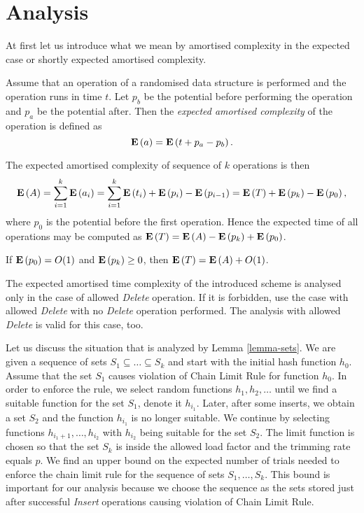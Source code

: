 \documentclass[runningheads,a4paper]{llncs}
\begin{document}
\section{Analysis}

At first let us introduce what we mean by amortised complexity in the expected case or shortly expected amortised complexity.

\begin{definition}
Assume that an operation of a randomised data structure is performed and the operation runs in time $t$. Let $p_b$ be the potential before performing the operation and $p_a$ be the potential after. Then the \emph{expected amortised complexity} of the operation is defined as \[ \mathbf{E}\left(a\right) = \mathbf{E}\left(t + p_a - p_{b}\right) \text{.} \]
\end{definition}

The expected amortised complexity of sequence of $k$ operations is then
\[
\mathbf{E}\left(A\right) = \sum_{i=1}^{k} \mathbf{E}\left(a_i\right) = \sum_{i = 1}^{k} \mathbf{E}\left(t_i\right) + \mathbf{E}\left(p_i\right) - \mathbf{E}\left(p_{i - 1}\right) = \mathbf{E}\left(T\right) + \mathbf{E}\left(p_k\right) - \mathbf{E}\left(p_0\right),
\]
where $p_0$ is the potential before the first operation. Hence the expected time of all operations may be computed as $\mathbf{E}\left(T\right) = \mathbf{E}\left(A\right) - \mathbf{E}\left(p_k\right) + \mathbf{E}\left(p_0\right)$.

\begin{remark}
\label{remark-expected-sequence}
If $\mathbf{E}\left(p_0\right) = O(1)$ and $\mathbf{E}\left(p_k\right) \geq 0$, then $\mathbf{E}\left(T\right) = \mathbf{E}\left(A\right) + O(1)$.
\end{remark}

The expected amortised time complexity of the introduced scheme is analysed only in the case of allowed \emph{Delete} operation. If it is forbidden, use the case with allowed \emph{Delete} with no \emph{Delete} operation performed. The analysis with allowed \emph{Delete} is valid for this case, too.

Let us discuss the situation that is analyzed by Lemma \ref{lemma-sets}. We are given a sequence of sets $S_1 \subseteq \dots \subseteq S_k$ and start with the initial hash function $h_0$. Assume that the set $S_1$ causes violation of Chain Limit Rule for function $h_0$. In order to enforce the rule, we select random functions $h_1, h_2, \dots$ until we find a suitable function for the set $S_1$, denote it $h_{i_1}$. Later, after some inserts, we obtain a set $S_2$ and the function $h_{i_1}$ is no longer suitable. We continue by selecting functions $h_{i_1 + 1}, \dots, h_{i_2}$ with $h_{i_2}$ being suitable for the set $S_2$. The limit function is chosen so that the set $S_k$ is inside the allowed load factor and the trimming rate equals $p$. We find an upper bound on the expected number of trials needed to enforce the chain limit rule for the sequence of sets $S_1, \dots, S_k$. This bound is important for our analysis because we choose the sequence as  the sets stored just after successful \emph{Insert} operations causing violation of Chain Limit Rule.
\end{document}
